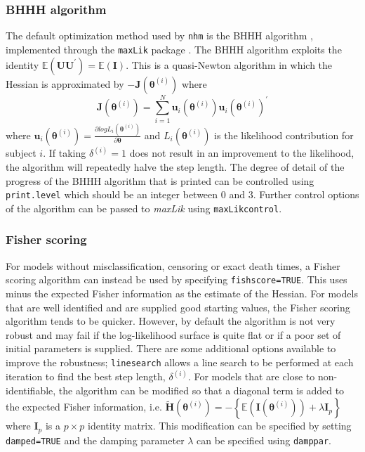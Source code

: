 \documentclass{article}
\numberwithin{equation}{section}
\begin{document}
\subsubsection*{BHHH algorithm}

The default optimization method used by \verb!nhm! is the BHHH algorithm \cite{bhhh}, implemented through the \verb!maxLik! package \cite{maxLik}. The BHHH algorithm exploits the identity $\mathbb{E}(\mathbf{U}\mathbf{U}^{'}) = \mathbb{E}(\mathbf{I})$. This is a quasi-Newton algorithm in which the Hessian is approximated by $-\mathbf{J}(\bm\theta^{(i)})$ where 
$$\mathbf{J}(\bm\theta^{(i)}) = \sum_{i=1}^{N} \mathbf{u}_i(\bm\theta^{(i)}) \mathbf{u}_i(\bm\theta^{(i)})^{'}$$
where $\mathbf{u}_i(\bm\theta^{(i)}) = \frac{\partial log L_i(\bm\theta^{(i)})}{\partial \bm\theta}$ and $L_i(\bm\theta^{(i)})$ is the likelihood contribution for subject $i$. If taking $\delta^{(i)} = 1$ does not result in an improvement to the likelihood, the algorithm will repeatedly halve the step length. The degree of detail of the progress of the BHHH algorithm that is printed can be controlled using \verb!print.level! which should be an integer between 0 and 3. Further control options of the algorithm can be passed to {\it maxLik} using \verb!maxLikcontrol!.

\subsubsection*{Fisher scoring}

For models without misclassification, censoring or exact death times, a Fisher scoring algorithm can instead be used by specifying \verb!fishscore=TRUE!.  This uses minus the expected Fisher information as the estimate of the Hessian. For models that are well identified and are supplied good starting values, the Fisher scoring algorithm tends to be quicker. However, by default the algorithm is not very robust and may fail if the log-likelihood surface is quite flat or if a poor set of initial parameters is supplied. There are some additional options available to improve the robustness; \verb!linesearch! allows a line search to be performed at each iteration to find the best step length, $\delta^{(i)}$. For models that are close to non-identifiable, the algorithm can be modified so that a diagonal term is added to the expected Fisher information, i.e. $\mathbf{\tilde{H}}(\bm\theta^{(i)}) = - \left\{\mathbb{E}(\mathbf{I}(\bm\theta^{(i)})) + \lambda \mathbf{I}_p\right\}$ where $\mathbf{I}_p$ is a $p \times p$ identity matrix. This modification can be specified by setting \verb!damped=TRUE! and the damping parameter $\lambda$ can be specified using \verb!damppar!. 
\end{document}
